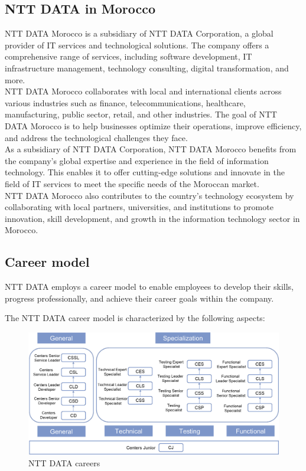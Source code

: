 \documentclass[12pt,a4paper,table,english]{article}
\begin{document}
	\pagebreak
	
	
	\subsection{NTT DATA in Morocco}
	
	NTT DATA Morocco is a subsidiary of NTT DATA Corporation, a global provider of IT services and technological solutions. The company offers a comprehensive range of services, including software development, IT infrastructure management, technology consulting, digital transformation, and more.\\
	
	NTT DATA Morocco collaborates with local and international clients across various industries such as finance, telecommunications, healthcare, manufacturing, public sector, retail, and other industries. The goal of NTT DATA Morocco is to help businesses optimize their operations, improve efficiency, and address the technological challenges they face.\\
	
	As a subsidiary of NTT DATA Corporation, NTT DATA Morocco benefits from the company's global expertise and experience in the field of information technology. This enables it to offer cutting-edge solutions and innovate in the field of IT services to meet the specific needs of the Moroccan market.\\
	
	NTT DATA Morocco also contributes to the country's technology ecosystem by collaborating with local partners, universities, and institutions to promote innovation, skill development, and growth in the information technology sector in Morocco.
	
	
	\subsection{Career model}
	
	
	NTT DATA employs a career model to enable employees to develop their skills, progress professionally, and achieve their career goals within the company.
	
	\noindent The NTT DATA career model is characterized by the following aspects:
	
	\begin{figure}[H]
		\centering
		\includegraphics[width=0.65\linewidth]{Image/nttcareer.png}
		\caption{NTT DATA careers}
		\label{fig:NTT DATA careers}
	\end{figure}
	
\end{document}
